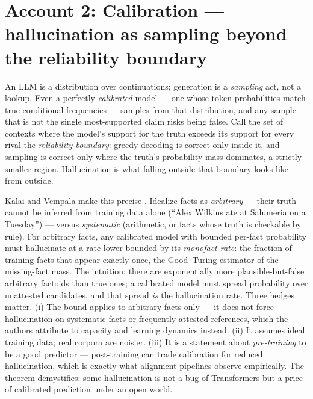 \documentclass[11pt]{article}
\begin{document}
\section{Account 2: Calibration --- hallucination as sampling beyond the reliability boundary}
An LLM is a distribution over continuations; generation is a \emph{sampling} act, not a lookup. Even a perfectly \emph{calibrated} model --- one whose token probabilities match true conditional frequencies --- samples from that distribution, and any sample that is not the single most-supported claim risks being false. Call the set of contexts where the model's support for the truth exceeds its support for every rival the \emph{reliability boundary}: greedy decoding is correct only inside it, and sampling is correct only where the truth's probability mass dominates, a strictly smaller region. Hallucination is what falling outside that boundary looks like from outside.

Kalai and Vempala make this precise \cite{kalai2024calibrated}. Idealize facts as \emph{arbitrary} --- their truth cannot be inferred from training data alone (``Alex Wilkins ate at Salumeria on a Tuesday'') --- versus \emph{systematic} (arithmetic, or facts whose truth is checkable by rule). For arbitrary facts, any calibrated model with bounded per-fact probability must hallucinate at a rate lower-bounded by its \emph{monofact rate}: the fraction of training facts that appear exactly once, the Good--Turing estimator of the missing-fact mass. The intuition: there are exponentially more plausible-but-false arbitrary factoids than true ones; a calibrated model must spread probability over unattested candidates, and that spread \emph{is} the hallucination rate. Three hedges matter. (i) The bound applies to arbitrary facts only --- it does not force hallucination on systematic facts or frequently-attested references, which the authors attribute to capacity and learning dynamics instead. (ii) It assumes ideal training data; real corpora are noisier. (iii) It is a statement about \emph{pre-training} to be a good predictor --- post-training can trade calibration for reduced hallucination, which is exactly what alignment pipelines observe empirically. The theorem demystifies: some hallucination is not a bug of Transformers but a price of calibrated prediction under an open world.
\end{document}
